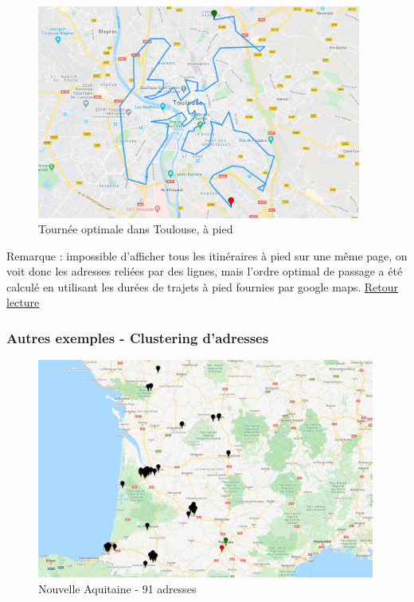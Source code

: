 \documentclass[12pt]{article}
\begin{document}
\begin{figure}[H]
\caption{Tournée optimale dans Toulouse, à pied}
\begin{center}
\includegraphics[width=0.95\textwidth]{toulouse walking}
\end{center}
\end{figure}

Remarque : impossible d'afficher tous les itinéraires à pied sur une même page, on voit donc les adresses reliées par des lignes, mais l'ordre optimal de passage a été calculé en utilisant les durées de trajets à pied fournies par google maps.
\hyperlink{Ref8}{Retour lecture}




\newpage
\hypertarget{Ref1}{}
\subsubsection{Autres exemples - Clustering d'adresses}
\begin{figure}[H]
\caption{Nouvelle Aquitaine - 91 adresses}
\begin{center}
\includegraphics[width=0.99\textwidth]{NA_adresses}
\end{center}
\end{figure}
\end{document}
